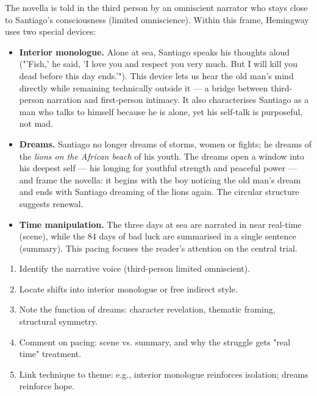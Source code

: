 \documentclass[11pt]{article}
\newcommand{\cle}[1]{{\popxbold\color{popdark}#1}}
\newcounter{popsec}
\newcounter{popsub}
\newcommand{\courssub}[1]{%
  \stepcounter{popsub}%
  \par\vspace{9pt}\noindent{\popxbold\fontsize{11.5}{13}\selectfont\color{popink}{\color{poporange}\thepopsec.\thepopsub}\hspace{6pt}#1}\par\nopagebreak\vspace{4pt}
}
\begin{document}
\courssub{Narrative Technique}

The novella is told in the \cle{third person} by an omniscient narrator who stays close to Santiago's consciousness (limited omniscience). Within this frame, Hemingway uses two special devices:

\begin{itemize}
\item \textbf{Interior monologue.} Alone at sea, Santiago speaks his thoughts aloud ("'Fish,' he said, 'I love you and respect you very much. But I will kill you dead before this day ends.'"). This device lets us hear the old man's mind directly while remaining technically outside it — a bridge between third-person narration and first-person intimacy. It also characterises Santiago as a man who talks to himself because he is alone, yet his self-talk is purposeful, not mad.
\item \textbf{Dreams.} Santiago no longer dreams of storms, women or fights; he dreams of the \emph{lions on the African beach} of his youth. The dreams open a window into his deepest self — his longing for youthful strength and peaceful power — and frame the novella: it begins with the boy noticing the old man's dream and ends with Santiago dreaming of the lions again. The circular structure suggests renewal.
\item \textbf{Time manipulation.} The three days at sea are narrated in near real-time (scene), while the 84 days of bad luck are summarised in a single sentence (summary). This pacing focuses the reader's attention on the central trial.
\end{itemize}

\begin{methode}
\begin{enumerate}
\item Identify the narrative voice (third-person limited omniscient).
\item Locate shifts into interior monologue or free indirect style.
\item Note the function of dreams: character revelation, thematic framing, structural symmetry.
\item Comment on pacing: scene vs. summary, and why the struggle gets "real time" treatment.
\item Link technique to theme: e.g., interior monologue reinforces isolation; dreams reinforce hope.
\end{enumerate}
\end{methode}
\end{document}
